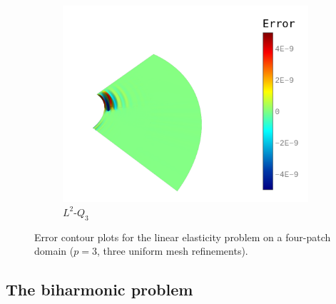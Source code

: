 \begin{figure}
\begin{subfigure}[t]{.45\linewidth}
		\center
		\includegraphics[scale=.4]{l2_annular}
		\caption{$L^2$-$Q_3$}
	\end{subfigure}
	\caption{Error contour plots for the linear elasticity problem on a four-patch domain ($p=3$, three uniform mesh refinements). }\label{fig:contour_plate_with_hole}
\end{figure}

\subsection{The biharmonic problem}\label{sec:biharmonic_problem}

